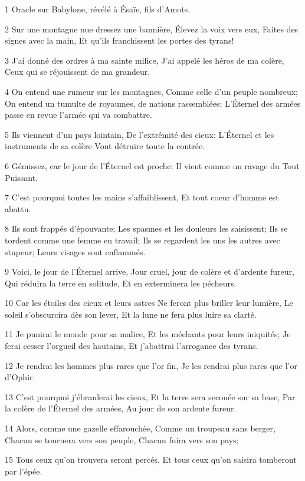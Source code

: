 \par 1 Oracle sur Babylone, révélé à Ésaïe, fils d'Amots.
\par 2 Sur une montagne nue dressez une bannière, Élevez la voix vers eux, Faites des signes avec la main, Et qu'ils franchissent les portes des tyrans!
\par 3 J'ai donné des ordres à ma sainte milice, J'ai appelé les héros de ma colère, Ceux qui se réjouissent de ma grandeur.
\par 4 On entend une rumeur sur les montagnes, Comme celle d'un peuple nombreux; On entend un tumulte de royaumes, de nations rassemblées: L'Éternel des armées passe en revue l'armée qui va combattre.
\par 5 Ils viennent d'un pays lointain, De l'extrémité des cieux: L'Éternel et les instruments de sa colère Vont détruire toute la contrée.
\par 6 Gémissez, car le jour de l'Éternel est proche: Il vient comme un ravage du Tout Puissant.
\par 7 C'est pourquoi toutes les mains s'affaiblissent, Et tout coeur d'homme est abattu.
\par 8 Ils sont frappés d'épouvante; Les spasmes et les douleurs les saisissent; Ils se tordent comme une femme en travail; Ils se regardent les uns les autres avec stupeur; Leurs visages sont enflammés.
\par 9 Voici, le jour de l'Éternel arrive, Jour cruel, jour de colère et d'ardente fureur, Qui réduira la terre en solitude, Et en exterminera les pécheurs.
\par 10 Car les étoiles des cieux et leurs astres Ne feront plus briller leur lumière, Le soleil s'obscurcira dès son lever, Et la lune ne fera plus luire sa clarté.
\par 11 Je punirai le monde pour sa malice, Et les méchants pour leurs iniquités; Je ferai cesser l'orgueil des hautains, Et j'abattrai l'arrogance des tyrans.
\par 12 Je rendrai les hommes plus rares que l'or fin, Je les rendrai plus rares que l'or d'Ophir.
\par 13 C'est pourquoi j'ébranlerai les cieux, Et la terre sera secouée sur sa base, Par la colère de l'Éternel des armées, Au jour de son ardente fureur.
\par 14 Alors, comme une gazelle effarouchée, Comme un troupeau sans berger, Chacun se tournera vers son peuple, Chacun fuira vers son pays;
\par 15 Tous ceux qu'on trouvera seront percés, Et tous ceux qu'on saisira tomberont par l'épée.
